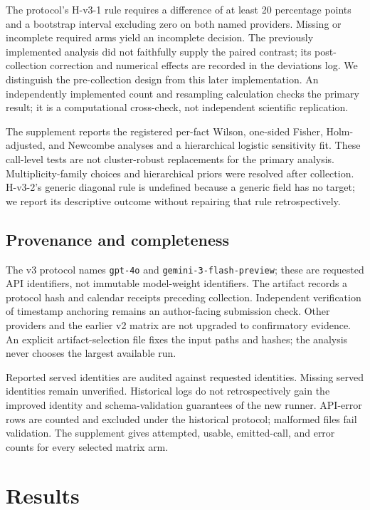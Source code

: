 \documentclass[10pt,journal,compsoc]{IEEEtran}
\begin{document}
The protocol's H-v3-1 rule requires a difference of at least 20 percentage points
and a bootstrap interval excluding zero on both named providers. Missing or
incomplete required arms yield an incomplete decision. The previously
implemented analysis did not faithfully supply the paired contrast; its
post-collection correction and numerical effects are recorded in the deviations
log. We distinguish the pre-collection design from this later implementation.
An independently implemented count and resampling calculation checks the primary
result; it is a computational cross-check, not independent scientific replication.

The supplement reports the registered per-fact Wilson, one-sided Fisher,
Holm-adjusted, and Newcombe analyses and a hierarchical logistic sensitivity
fit. These call-level tests are not cluster-robust replacements for the primary
analysis. Multiplicity-family choices and hierarchical priors were resolved
after collection. H-v3-2's generic diagonal rule is undefined because a generic
field has no target; we report its descriptive outcome without repairing that
rule retrospectively.

\subsection{Provenance and completeness}
The v3 protocol names \texttt{gpt-4o} and \texttt{gemini-3-flash-preview}; these
are requested API identifiers, not immutable model-weight identifiers. The
artifact records a protocol hash and calendar receipts preceding collection.
Independent verification of timestamp anchoring remains an author-facing
submission check. Other providers and the earlier v2 matrix are not upgraded
to confirmatory evidence. An explicit artifact-selection file fixes the input
paths and hashes; the analysis never chooses the largest available run.

Reported served identities are audited against requested identities. Missing
served identities remain unverified. Historical logs do not retrospectively
gain the improved identity and schema-validation guarantees of the new runner.
API-error rows are counted and excluded under the historical protocol; malformed
files fail validation. The supplement gives attempted, usable, emitted-call,
and error counts for every selected matrix arm.

\section{Results}
\end{document}
